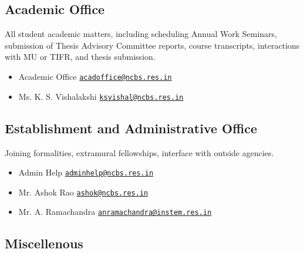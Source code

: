 \documentclass[a4paper]{extarticle}
\newcommand\MAILTO[2]{#1 \Letter\; \href{mailto:#2}{\nolinkurl{#2}}}
\begin{document}
\subsection{Academic Office} 
All student academic matters, including scheduling
Annual Work Seminars, submission of Thesis Advisory Committee reports, course
transcripts, interactions with MU or TIFR, and thesis submission.

\begin{itemize}
    \item \MAILTO{Academic Office}{acadoffice@ncbs.res.in} 
    \item \MAILTO{Ms. K. S. Vishalakshi}{ksvishal@ncbs.res.in}
\end{itemize}

\subsection{Establishment and Administrative Office}
Joining formalities, extramural fellowships, interface with outside agencies.

\begin{itemize}
    \item \MAILTO{Admin Help}{adminhelp@ncbs.res.in}
    \item \MAILTO{Mr. Ashok Rao}{ashok@ncbs.res.in}
    \item \MAILTO{Mr. A. Ramachandra}{anramachandra@instem.res.in}
\end{itemize}

\subsection{Miscellenous}
\end{document}
